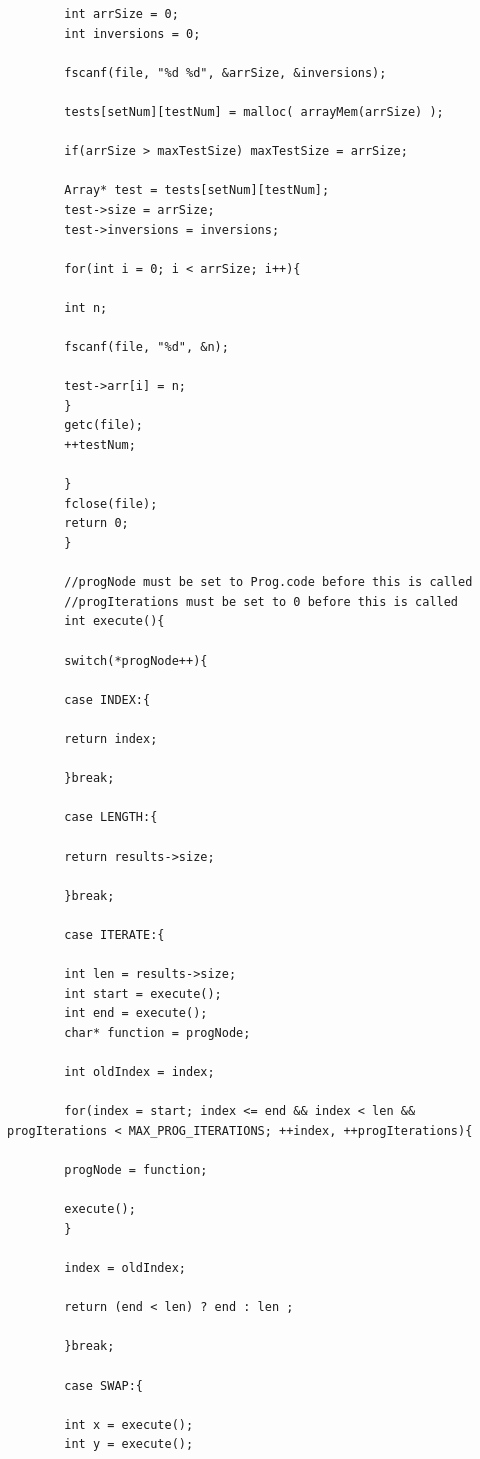 \documentclass{article}
\begin{document}
\begin{lstlisting}
	    int arrSize = 0;
	    int inversions = 0;
	    
	    fscanf(file, "%d %d", &arrSize, &inversions);
	    
	    tests[setNum][testNum] = malloc( arrayMem(arrSize) );
	    
	    if(arrSize > maxTestSize) maxTestSize = arrSize;
	    
	    Array* test = tests[setNum][testNum];
	    test->size = arrSize;
	    test->inversions = inversions;
	    
	    for(int i = 0; i < arrSize; i++){
	    
	    int n;
	    
	    fscanf(file, "%d", &n);
	    
	    test->arr[i] = n;
	    }        
	    getc(file);
	    ++testNum;
	    
	    }
	    fclose(file);
	    return 0;
	    }
	    
	    //progNode must be set to Prog.code before this is called
	    //progIterations must be set to 0 before this is called
	    int execute(){
	    
	    switch(*progNode++){
	    
	    case INDEX:{
	    
	    return index;
	    
	    }break;
	    
	    case LENGTH:{
	    
	    return results->size;
	    
	    }break;
	    
	    case ITERATE:{
	    
	    int len = results->size;
	    int start = execute();
	    int end = execute();
	    char* function = progNode;
	    
	    int oldIndex = index;
	    
	    for(index = start; index <= end && index < len && progIterations < MAX_PROG_ITERATIONS; ++index, ++progIterations){
	    
	    progNode = function;
	    
	    execute();
	    }
	    
	    index = oldIndex;
	    
	    return (end < len) ? end : len ;
	    
	    }break;
	    
	    case SWAP:{
	    
	    int x = execute();
	    int y = execute();
	    

\end{lstlisting}
\end{document}
